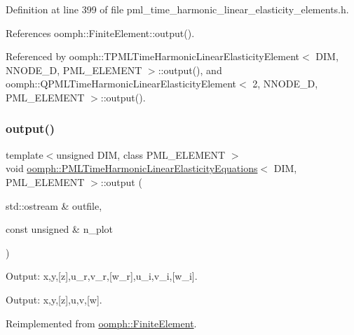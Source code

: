Definition at line 399 of file pml\+\_\+time\+\_\+harmonic\+\_\+linear\+\_\+elasticity\+\_\+elements.\+h.



References oomph\+::\+Finite\+Element\+::output().



Referenced by oomph\+::\+T\+P\+M\+L\+Time\+Harmonic\+Linear\+Elasticity\+Element$<$ D\+I\+M, N\+N\+O\+D\+E\+\_\+D, P\+M\+L\+\_\+\+E\+L\+E\+M\+E\+N\+T $>$\+::output(), and oomph\+::\+Q\+P\+M\+L\+Time\+Harmonic\+Linear\+Elasticity\+Element$<$ 2, N\+N\+O\+D\+E\+\_\+D, P\+M\+L\+\_\+\+E\+L\+E\+M\+E\+N\+T $>$\+::output().

\mbox{\label{classoomph_1_1PMLTimeHarmonicLinearElasticityEquations_a0c7fe3f1d343009a7289fd85becc58a6}} 
\subsubsection{\texorpdfstring{output()}{output()}\hspace{0.1cm}{\footnotesize\ttfamily [2/4]}}
{\footnotesize\ttfamily template$<$unsigned D\+IM, class P\+M\+L\+\_\+\+E\+L\+E\+M\+E\+NT $>$ \\
void \hyperlink{classoomph_1_1PMLTimeHarmonicLinearElasticityEquations}{oomph\+::\+P\+M\+L\+Time\+Harmonic\+Linear\+Elasticity\+Equations}$<$ D\+IM, P\+M\+L\+\_\+\+E\+L\+E\+M\+E\+NT $>$\+::output (\begin{DoxyParamCaption}\item[{std\+::ostream \&}]{outfile,  }\item[{const unsigned \&}]{n\+\_\+plot }\end{DoxyParamCaption})\hspace{0.3cm}{\ttfamily [virtual]}}



Output\+: x,y,\mbox{[}z\mbox{]},u\+\_\+r,v\+\_\+r,\mbox{[}w\+\_\+r\mbox{]},u\+\_\+i,v\+\_\+i,\mbox{[}w\+\_\+i\mbox{]}. 

Output\+: x,y,\mbox{[}z\mbox{]},u,v,\mbox{[}w\mbox{]}. 

Reimplemented from \hyperlink{classoomph_1_1FiniteElement_afa9d9b2670f999b43e6679c9dd28c457}{oomph\+::\+Finite\+Element}.



